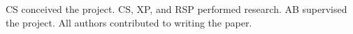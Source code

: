 CS conceived the project. CS, XP, and RSP performed research. AB supervised the project. All authors contributed to writing the paper.

